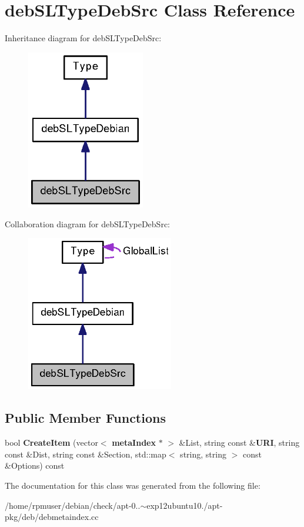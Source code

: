 \section{deb\-S\-L\-Type\-Deb\-Src \-Class \-Reference}
\label{classdebSLTypeDebSrc}


\-Inheritance diagram for deb\-S\-L\-Type\-Deb\-Src\-:
\nopagebreak
\begin{figure}[H]
\begin{center}
\leavevmode
\includegraphics[width=146pt]{classdebSLTypeDebSrc__inherit__graph}
\end{center}
\end{figure}


\-Collaboration diagram for deb\-S\-L\-Type\-Deb\-Src\-:
\nopagebreak
\begin{figure}[H]
\begin{center}
\leavevmode
\includegraphics[width=182pt]{classdebSLTypeDebSrc__coll__graph}
\end{center}
\end{figure}
\subsection*{\-Public \-Member \-Functions}
\begin{DoxyCompactItemize}
\item 
bool {\bfseries \-Create\-Item} (vector$<$ {\bf meta\-Index} $\ast$ $>$ \&\-List, string const \&{\bf \-U\-R\-I}, string const \&\-Dist, string const \&\-Section, std\-::map$<$ string, string $>$ const \&\-Options) const \label{classdebSLTypeDebSrc_a8776fe2f559ba3004185193a04c1a974}

\end{DoxyCompactItemize}


\-The documentation for this class was generated from the following file\-:\begin{DoxyCompactItemize}
\item 
/home/rpmuser/debian/check/apt-\/0..$\sim$exp12ubuntu10./apt-\/pkg/deb/debmetaindex.\-cc\end{DoxyCompactItemize}
